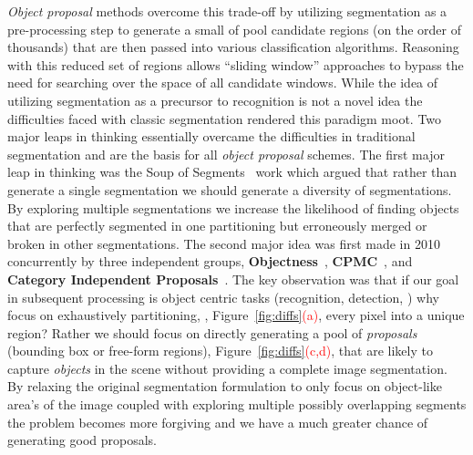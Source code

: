 \emph{Object proposal} methods overcome this trade-off by utilizing segmentation as a pre-processing step to generate a small of pool candidate regions (on the order of thousands) that are then passed into various classification algorithms. Reasoning with this reduced set of regions allows ``sliding window'' approaches to bypass the need for searching over the space of all candidate windows. While the idea of utilizing segmentation as a precursor to recognition is not a novel idea the difficulties faced with classic segmentation rendered this paradigm moot. Two major leaps in thinking essentially overcame the difficulties in traditional segmentation and are the basis for all \emph{object proposal} schemes. The first major leap in thinking was the Soup of Segments~\cite{Malisiewicz:Efros:BMVC07} work which argued that rather than generate a single segmentation we should generate a diversity of segmentations. By exploring multiple segmentations we increase the likelihood of finding objects that are perfectly segmented in one partitioning but erroneously merged or broken in other segmentations. The second major idea was first made in 2010 concurrently by three independent groups, {\bf Objectness}~\cite{Alexe:etal:PAMI12}, {\bf CPMC}~\cite{Carreira:Sminchisescu:PAMI12}, and {\bf Category Independent Proposals}~\cite{Endres:Hoiem:PAMI14}. The key observation was that if our goal in subsequent processing is object centric tasks (recognition, detection, \etc) why focus on exhaustively partitioning, , Figure~\ref{fig:diffs}\textcolor{red}{(a)}, every pixel into a unique region? Rather we should focus on directly generating a pool of \emph{proposals} (bounding box or free-form regions), Figure~\ref{fig:diffs}\textcolor{red}{(c,d)}, that are likely to capture \emph{objects} in the scene without providing a complete image segmentation. By relaxing the original segmentation formulation to only focus on object-like area's of the image coupled with exploring multiple possibly overlapping segments the problem becomes more forgiving and we have a much greater chance of generating good proposals. 

